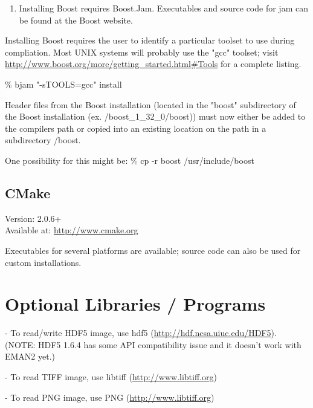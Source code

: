   \begin{enumerate}
    \item
      Installing Boost requires Boost.Jam.  Executables and
      source code for jam can be found at the Boost website.
  \end {enumerate}

  Installing Boost requires the user to identify a particular
  toolset to use during compliation.  Most UNIX systems will
  probably use the "gcc" toolset; visit
  \href{http://www.boost.org/more/getting\_started.html\#Tools}{http://www.boost.org/more/getting\_started.html\#Tools}
  for a complete listing.        

  {\color{blue}\% bjam "-sTOOLS=gcc" install }

  Header files from the Boost installation (located in the
  "boost" subdirectory of the Boost installation
  (ex. /boost\_1\_32\_0/boost)) must now either be added to the
  compilers path or copied into an existing location on the path
  in a subdirectory /boost.

  One possibility for this might be:
  {\color{blue}\% cp -r boost /usr/include/boost}
      
  
\subsection{CMake}
  Version: 2.0.6+\\
  Available at: \href{http://www.cmake.org}{http://www.cmake.org}
    

       Executables for several platforms are available; source code
       can also be used for custom installations.


\section{Optional Libraries / Programs} 
\label{OPTIONAL-LIBRARIES} 

  - To read/write HDF5 image, use hdf5 (\href{http://hdf.ncsa.uiuc.edu/HDF5}{http://hdf.ncsa.uiuc.edu/HDF5}).
	  (NOTE: HDF5 1.6.4 has some API compatibility issue and it doesn't work	        with EMAN2 yet.)
	  
    - To read TIFF image, use libtiff (\href{http://www.libtiff.org}{http://www.libtiff.org})

    - To read PNG image, use PNG (\href{http://www.libpng.org}{http://www.libtiff.org})

